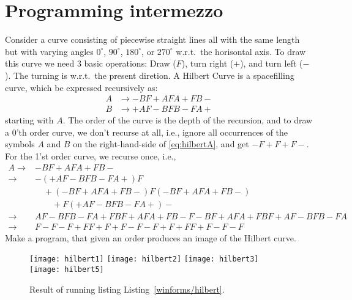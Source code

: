 \section{Programming intermezzo}
\begin{problem}
  Consider a curve consisting of piecewise straight lines all with the same length but with varying angles $0^{\circ}$, $90^{\circ}$, $180^{\circ}$, or $270^{\circ}$ w.r.t.\ the horisontal axis. To draw this curve we need 3 basic operations: Draw ($F$), turn right ($+$), and turn left ($-$). The turning is w.r.t.\ the present diretion. A Hilbert Curve is a spacefilling curve, which be expressed recursively as:
\begin{align}
  A &\rightarrow -BF+AFA+FB-\label{eq:hilbertA}\\
  B &\rightarrow +AF-BFB-FA+\label{eq:hilbertB}
\end{align}
starting with $A$. The order of the curve is the depth of the recursion, and to draw a 0'th order curve, we don't recurse at all, i.e., ignore all occurrences of the symbols $A$ and $B$ on the right-hand-side of \eqref{eq:hilbertA}, and get $-F+F+F-$. For the 1'st order curve, we recurse once, i.e., 
\begin{align*}
  A 
  \rightarrow &-BF+AFA+FB- \\
  \rightarrow &-(+AF-BFB-FA+)F\\
               &\quad+(-BF+AFA+FB-)F(-BF+AFA+FB-)\\
               &\qquad +F(+AF-BFB-FA+)-\\
  \rightarrow &AF-BFB-FA+FBF+AFA+FB-F-BF+AFA+FBF+AF-BFB-FA\\
  \rightarrow &F-F-F+FF+F+F-F-F+F+FF+F-F-F
\end{align*}
Make a program, that given an order produces an image of the Hilbert curve.
\end{problem}
%
%
\begin{figure}
  \centering
  \texttt{[image: hilbert1]}
  \texttt{[image: hilbert2]}
  \texttt{[image: hilbert3]}
  \texttt{[image: hilbert5]}
  \caption{Result of running listing Listing~\ref{winforms/hilbert}.}
  \label{fig:hilbert1}
\end{figure}

%
%

